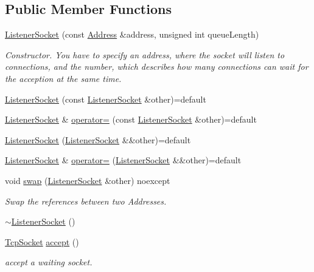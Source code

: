 \subsection*{Public Member Functions}
\begin{DoxyCompactItemize}
\item 
\hyperlink{classtnnf_1_1_listener_socket_a1a0f59dda54f2e9453f292533b7c1a5f}{Listener\+Socket} (const \hyperlink{classtnnf_1_1_address}{Address} \&address, unsigned int queue\+Length)
\begin{DoxyCompactList}\small\item\em Constructor. You have to specify an address, where the socket will listen to connections, and the number, which describes how many connections can wait for the acception at the same time. \end{DoxyCompactList}\item 
\hyperlink{classtnnf_1_1_listener_socket_af32d33b4dd6cacf1af5c4e63883c413d}{Listener\+Socket} (const \hyperlink{classtnnf_1_1_listener_socket}{Listener\+Socket} \&other)=default
\item 
\hyperlink{classtnnf_1_1_listener_socket}{Listener\+Socket} \& \hyperlink{classtnnf_1_1_listener_socket_a01dd8e3ec68992d65c1efacdfd78050c}{operator=} (const \hyperlink{classtnnf_1_1_listener_socket}{Listener\+Socket} \&other)=default
\item 
\hyperlink{classtnnf_1_1_listener_socket_a479b9568b70178cf10ccfab9d3af996f}{Listener\+Socket} (\hyperlink{classtnnf_1_1_listener_socket}{Listener\+Socket} \&\&other)=default
\item 
\hyperlink{classtnnf_1_1_listener_socket}{Listener\+Socket} \& \hyperlink{classtnnf_1_1_listener_socket_a548b8dd07d1caf85cf730e6f3cf6f04a}{operator=} (\hyperlink{classtnnf_1_1_listener_socket}{Listener\+Socket} \&\&other)=default
\item 
void \hyperlink{classtnnf_1_1_listener_socket_a4bfba9a5b7ef8a6d89df91ca13f4334e}{swap} (\hyperlink{classtnnf_1_1_listener_socket}{Listener\+Socket} \&other) noexcept
\begin{DoxyCompactList}\small\item\em Swap the references between two Addresses. \end{DoxyCompactList}\item 
\hyperlink{classtnnf_1_1_listener_socket_a324bb8f14df9dd5aa8434f7c26a5e62d}{$\sim$\+Listener\+Socket} ()
\item 
\hyperlink{classtnnf_1_1_tcp_socket}{Tcp\+Socket} \hyperlink{classtnnf_1_1_listener_socket_ab430263cdbc66b23d7c0950a0bf60bea}{accept} ()
\begin{DoxyCompactList}\small\item\em accept a waiting socket. \end{DoxyCompactList}\end{DoxyCompactItemize}
